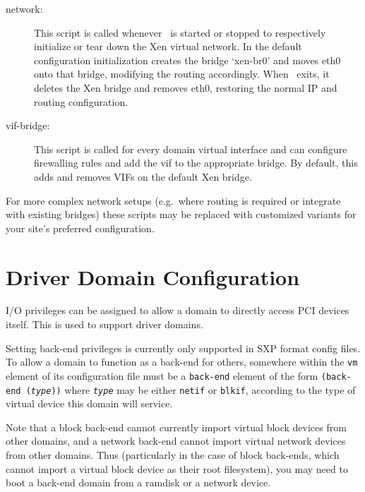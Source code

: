 \begin{description}
\item[network:] This script is called whenever \xend\ is started or
  stopped to respectively initialize or tear down the Xen virtual
  network. In the default configuration initialization creates the
  bridge `xen-br0' and moves eth0 onto that bridge, modifying the
  routing accordingly. When \xend\ exits, it deletes the Xen bridge
  and removes eth0, restoring the normal IP and routing configuration.


\item[vif-bridge:] This script is called for every domain virtual
  interface and can configure firewalling rules and add the vif to the
  appropriate bridge. By default, this adds and removes VIFs on the
  default Xen bridge.
\end{description}

For more complex network setups (e.g.\ where routing is required or
integrate with existing bridges) these scripts may be replaced with
customized variants for your site's preferred configuration.



\section{Driver Domain Configuration}

I/O privileges can be assigned to allow a domain to directly access
PCI devices itself.  This is used to support driver domains.

Setting back-end privileges is currently only supported in SXP format
config files.  To allow a domain to function as a back-end for others,
somewhere within the {\tt vm} element of its configuration file must
be a {\tt back-end} element of the form {\tt (back-end ({\em type}))}
where {\tt \em type} may be either {\tt netif} or {\tt blkif},
according to the type of virtual device this domain will service.

Note that a block back-end cannot currently import virtual block
devices from other domains, and a network back-end cannot import
virtual network devices from other domains.  Thus (particularly in the
case of block back-ends, which cannot import a virtual block device as
their root filesystem), you may need to boot a back-end domain from a
ramdisk or a network device.

